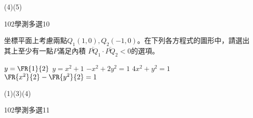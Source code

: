\begin{QUESTIONS}
\begin{QUESTION}
        \begin{QFROMS}
        \end{QFROMS}
        \begin{QTAGS}\end{QTAGS}
        \begin{QANS}
            (4)(5)
        \end{QANS}
        \begin{QSOLLIST}
        \end{QSOLLIST}
        \begin{QEMPTYSPACE}
        \end{QEMPTYSPACE}
    \end{QUESTION}
    \begin{QUESTION}
        \begin{ExamInfo}{102}{學測}{多選}{10}
        \end{ExamInfo}
        \begin{ExamAnsRateInfo}{36}{60}{30}{18}
        \end{ExamAnsRateInfo}
        \begin{QBODY}
		坐標平面上考慮兩點${{Q}_{1}}(1,0),{{Q}_{2}}(-1,0)$。在下列各方程式的圖形中，請選出其上至少有一點$P$滿足內積 $\lvec{PQ_{1}}\cdot \lvec{PQ_{2}}<0$的選項。
		\begin{QOPS}
			\QOP $y=\FR{1}{2}$  
			\QOP $y={{x}^{2}}+1$ 
			\QOP $-{{x}^{2}}+2{{y}^{2}}=1$
			\QOP $4{{x}^{2}}+{{y}^{2}}=1$
			\QOP $\FR{{{x}^{2}}}{2}-\FR{{{y}^{2}}}{2}=1$
		\end{QOPS}
        \end{QBODY}
        \begin{QFROMS}
        \end{QFROMS}
        \begin{QTAGS}\end{QTAGS}
        \begin{QANS}
            (1)(3)(4)
        \end{QANS}
        \begin{QSOLLIST}
        \end{QSOLLIST}
        \begin{QEMPTYSPACE}
        \end{QEMPTYSPACE}
    \end{QUESTION}
    \begin{QUESTION}
        \begin{ExamInfo}{102}{學測}{多選}{11}
        \end{ExamInfo}
        \begin{ExamAnsRateInfo}{42}{58}{45}{23}

\end{ExamAnsRateInfo}
\end{QUESTION}
\end{QUESTIONS}
